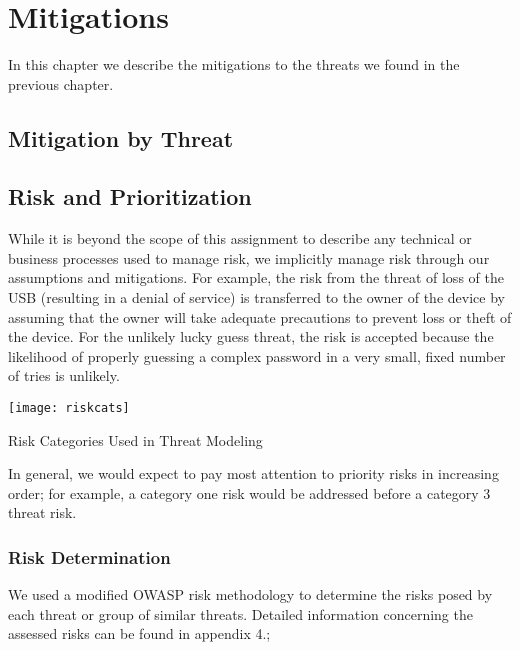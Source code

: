\chapter{Mitigations}
\label{ch:mitigations}
In this chapter we describe the mitigations to the threats we found in
the previous chapter.

\section{Mitigation by Threat}

\section{Risk and Prioritization}
\label{sec:risk}
While it is beyond the scope of this assignment to describe any technical or business processes used to manage risk, we implicitly manage risk through our assumptions and mitigations.  For example, the risk from the threat of loss of the USB (resulting in a denial of service) is transferred to the owner of the device by assuming that the owner will take adequate precautions to prevent loss or theft of the device.  For the unlikely lucky guess threat, the risk is accepted because the likelihood of properly guessing a complex password in a very small, fixed number of tries is unlikely.

\begin{marginfigure}
    \centering
    \texttt{[image: riskcats]}
    \caption{Risk Categories Used in Threat Modeling}
    \label{fig:riskcats}
\end{marginfigure}

In general, we would expect to pay most attention to priority risks in increasing order; for example, a category one risk would be addressed before a category 3 threat risk.

\subsection{Risk Determination}
We used a modified OWASP risk methodology to determine the risks posed by each threat or group of similar threats. Detailed information concerning the assessed risks can be found in appendix 4.;

